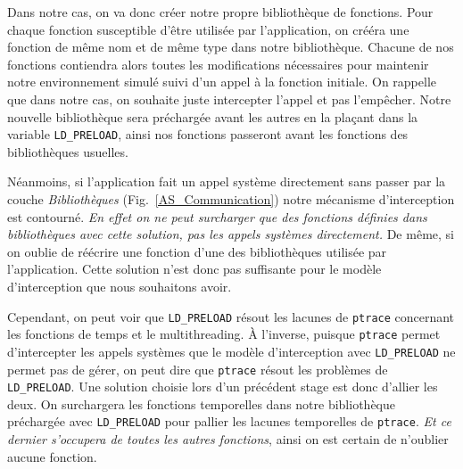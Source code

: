 Dans notre cas, on va donc créer notre propre bibliothèque de fonctions. Pour
chaque fonction susceptible d'être utilisée par l'application, on crééra une
fonction de même nom et de même type dans notre bibliothèque. Chacune de nos
fonctions contiendra alors toutes les modifications nécessaires pour maintenir
notre environnement simulé suivi d'un appel à la fonction initiale. On rappelle
que dans notre cas, on souhaite juste intercepter l'appel et pas l'empêcher.
Notre nouvelle bibliothèque sera préchargée avant les autres en la plaçant dans
la variable \texttt{LD\_PRELOAD}, ainsi nos fonctions passeront avant les
fonctions des bibliothèques usuelles.

Néanmoins, si l'application fait un appel système directement sans passer par la
couche \textit{Bibliothèques} (Fig.~\ref{AS_Communication}) notre mécanisme
d'interception est contourné. \textit{En effet on ne peut surcharger que des
  fonctions définies dans bibliothèques avec cette solution, pas les appels
  systèmes directement.} De même, si on oublie de réécrire une fonction d'une
des bibliothèques utilisée par l'application. Cette solution n'est donc pas
suffisante pour le modèle d'interception que nous souhaitons avoir.

Cependant, on peut voir que \texttt{LD\_PRELOAD} résout les lacunes de
\texttt{ptrace} concernant les fonctions de temps et le multithreading. À
l'inverse, puisque \texttt{ptrace} permet d'intercepter les appels systèmes que
le modèle d'interception avec \texttt{LD\_PRELOAD} ne permet pas de gérer, on
peut dire que \texttt{ptrace} résout les problèmes de \texttt{LD\_PRELOAD}. Une
solution choisie lors d'un précédent stage est donc d'allier les deux. On
surchargera les fonctions temporelles dans notre bibliothèque préchargée avec
\texttt{LD\_PRELOAD} pour pallier les lacunes temporelles de
\texttt{ptrace}. \textit{Et ce dernier s'occupera de toutes les autres
  fonctions}, ainsi on est certain de n'oublier aucune fonction.

